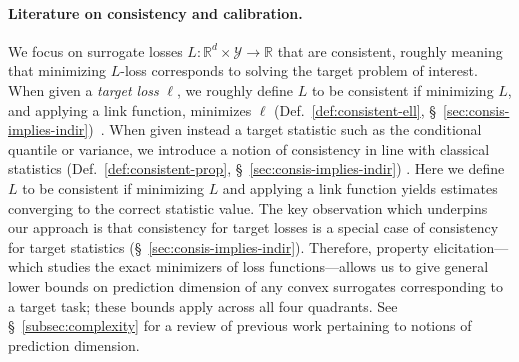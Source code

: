 \documentclass[11pt]{article} %
\newcommand{\Comments}{1}
\newcommand{\mynote}[2]{\ifnum\Comments=1\textcolor{#1}{#2}\fi}
\newcommand{\mytodo}[2]{\ifnum\Comments=1%
	\todo[linecolor=#1!80!black,backgroundcolor=#1,bordercolor=#1!80!black]{#2}\fi}
\newcommand{\raft}[1]{\mytodo{green!20!white}{RF: #1}}
\newcommand{\jessie}[1]{\mynote{teal}{[JF: #1]}}
\newcommand{\jessiet}[1]{\mytodo{teal!20!white}{JF: #1}}
\newcommand{\bo}[1]{\mynote{blue}{[Bo: #1]}}
\newcommand{\reals}{\mathbb{R}}
\newcommand{\Y}{\mathcal{Y}}
\begin{document}
\paragraph{Literature on consistency and calibration.}%
We focus on surrogate losses $L: \reals^d \times \Y \to \reals$ that are consistent, roughly meaning that minimizing $L$-loss corresponds to solving the target problem of interest.
When given a \emph{target loss} $\ell$, we roughly define $L$ to be consistent if minimizing $L$, and applying a link function, minimizes $\ell$ (Def.~\ref{def:consistent-ell}, \S~\ref{sec:consis-implies-indir})~\citep{zhang2004statistical,bartlett2006convexity,tewari2007consistency,steinwart2007compare,ramaswamy2016convex}.
When given instead a target statistic such as the conditional quantile or variance, we introduce a notion of consistency in line with classical statistics (Def.~\ref{def:consistent-prop}, \S~\ref{sec:consis-implies-indir}) \citep{gyorfi2006distribution, fan1998efficient,ruppert1997local}.
Here we define $L$ to be consistent if minimizing $L$ and applying a link function yields estimates converging to the correct statistic value.
The key observation which underpins our approach is that consistency for target losses is a special case of consistency for target statistics (\S~\ref{sec:consis-implies-indir}).
Therefore, property elicitation---which studies the exact minimizers of loss functions---allows us to give general lower bounds on prediction dimension of any convex surrogates corresponding to a target task; these bounds apply across all four quadrants.
See \S~\ref{subsec:complexity} for a review of previous work pertaining to notions of prediction dimension. 

\end{document}
